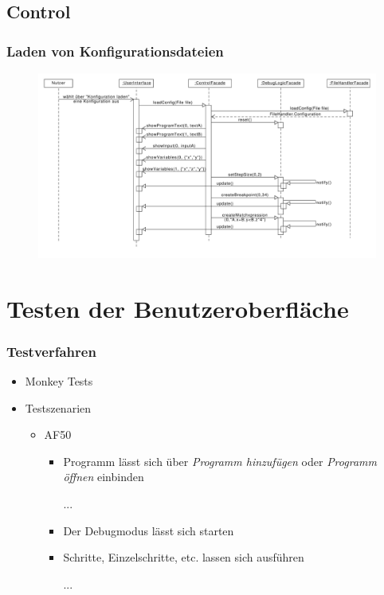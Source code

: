 \documentclass{beamer}
\begin{document}
\subsection{Control}
\begin{frame}
\frametitle{Laden von Konfigurationsdateien}
\begin{figure}
\centering
\includegraphics[width=1\textwidth]{../../Enwurf/diagrammIdeenUmlet/SequenceDiagrams/seq_loadConfigPDF.pdf}
\end{figure}
\end{frame}

\section{Testen der Benutzeroberfläche} 

\begin{frame}
\frametitle{Testverfahren}
\begin{itemize}
    \item Monkey Tests
    \item Testszenarien
    \begin{itemize}
        \item AF50
        \begin{itemize}
            \item Programm lässt sich über \textit{Programm hinzufügen} oder \textit{Programm öffnen} einbinden
            \item [...]
            \item Der Debugmodus lässt sich starten
            \item Schritte, Einzelschritte, etc. lassen sich ausführen 
            \item [...]
        \end{itemize}
    \end{itemize}
\end{itemize}
\end{frame}
\end{document}
